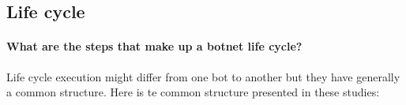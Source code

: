 \subsection{Life cycle}
\paragraph{What are the steps that make up a botnet life cycle?} Life cycle execution might differ from one bot to another but they have generally a common structure. Here is te common structure presented in these studies: 
